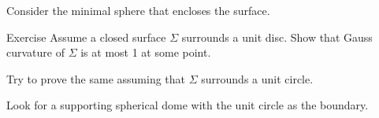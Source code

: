 Consider the minimal sphere that encloses the surface.

\begin{thm}{Exercise}
Assume a closed surface $\Sigma$ surrounds a unit disc.
Show that Gauss curvature of $\Sigma$ is at most 1 at some point. 

Try to prove the same assuming that $\Sigma$ surrounds a unit circle.
\end{thm}

Look for a supporting spherical dome with the unit circle as the boundary.

